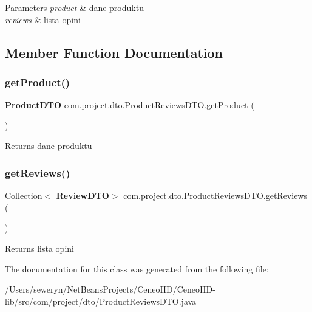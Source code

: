 \begin{DoxyParams}{Parameters}
{\em product} & dane produktu \\
\hline
{\em reviews} & lista opini \\
\hline
\end{DoxyParams}


\subsection{Member Function Documentation}
\mbox{\label{classcom_1_1project_1_1dto_1_1_product_reviews_d_t_o_a6dadd6b6bbc5e07c92c9f6949049e960}} 
\subsubsection{get\+Product()}
{\footnotesize\ttfamily \textbf{ Product\+D\+TO} com.\+project.\+dto.\+Product\+Reviews\+D\+T\+O.\+get\+Product (\begin{DoxyParamCaption}{ }\end{DoxyParamCaption})}

\begin{DoxyReturn}{Returns}
dane produktu 
\end{DoxyReturn}
\mbox{\label{classcom_1_1project_1_1dto_1_1_product_reviews_d_t_o_aea275d8fea1ee99b7e28d6813c3130b1}} 
\subsubsection{get\+Reviews()}
{\footnotesize\ttfamily Collection$<$\textbf{ Review\+D\+TO}$>$ com.\+project.\+dto.\+Product\+Reviews\+D\+T\+O.\+get\+Reviews (\begin{DoxyParamCaption}{ }\end{DoxyParamCaption})}

\begin{DoxyReturn}{Returns}
lista opini 
\end{DoxyReturn}


The documentation for this class was generated from the following file\+:\begin{DoxyCompactItemize}
\item 
/\+Users/seweryn/\+Net\+Beans\+Projects/\+Ceneo\+H\+D/\+Ceneo\+H\+D-\/lib/src/com/project/dto/Product\+Reviews\+D\+T\+O.\+java\end{DoxyCompactItemize}

